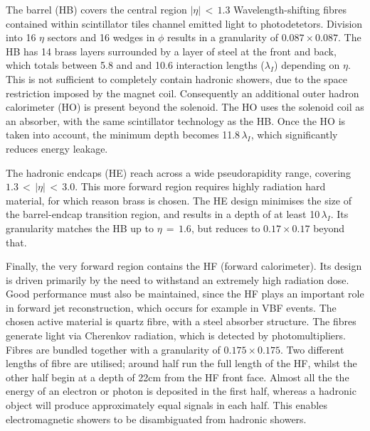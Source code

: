 The barrel (HB) covers the central region $|\eta|\,<\,1.3$
Wavelength-shifting fibres contained within scintillator tiles channel emitted light to photodetetors.
Division into 16 $\eta$ sectors and 16 wedges in $\phi$ results in a granularity of $0.087\times0.087$.
The HB has 14 brass layers surrounded by a layer of steel at the front and back, 
which totals between 5.8 and and 10.6 interaction lengths ($\lambda_I$) depending on $\eta$. %
This is not sufficient to completely contain hadronic showers, due to the space restriction imposed by the magnet coil.
Consequently an additional outer hadron calorimeter (HO) is present beyond the solenoid.
The HO uses the solenoid coil as an absorber, with the same scintillator technology as the HB.
Once the HO is taken into account, the minimum depth becomes 11.8\,$\lambda_I$, 
which significantly reduces energy leakage. %

The hadronic endcaps (HE) reach across a wide pseudorapidity range, covering $1.3\,<\,|\eta|\,<\,3.0$.
This more forward region requires highly radiation hard material, for which reason brass is chosen. %
The HE design minimises the size of the barrel-endcap transition region, and results in a depth of at least 10\,$\lambda_I$.
Its granularity matches the HB up to $\eta\,=\,1.6$, but reduces to $0.17\times0.17$ beyond that.

Finally, the very forward region contains the HF (forward calorimeter).
Its design is driven primarily by the need to withstand an extremely high radiation dose.
Good performance must also be maintained, since the HF plays an important role in forward jet reconstruction, which occurs for example in VBF \Hgg events.
The chosen active material is quartz fibre, with a steel absorber structure.
The fibres generate light via Cherenkov radiation, which is detected by photomultipliers.
Fibres are bundled together with a granularity of $0.175\times0.175$.
Two different lengths of fibre are utilised; 
around half run the full length of the HF, whilst the other half begin at a depth of 22cm from the HF front face.
Almost all the the energy of an electron or photon is deposited in the first half, 
whereas a hadronic object will produce approximately equal signals in each half.
This enables electromagnetic showers to be disambiguated from hadronic showers.

